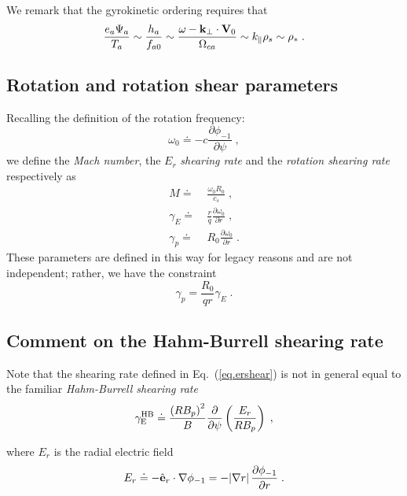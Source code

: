 We remark that the gyrokinetic ordering requires that 
%
\begin{equation}
\frac{e_a \Psi_a}{T_a} \sim \frac{h_a}{f_{a0}} 
\sim \frac{\omega - {\bf k}_\perp \cdot {\bf V}_0}{\Omega_{ca}} 
\sim k_\parallel \rho_s \sim \rho_* \; .  
\label{eq.ordrho}
\end{equation}

\subsection{Rotation and rotation shear parameters}

Recalling the definition of the rotation frequency:
%
\begin{equation}
\omega_0 \doteq -c \frac{\partial\phi_{-1}}{\partial\psi} \; , 
\end{equation}
%
we define the {\it Mach number}, the $E_r$ {\it shearing rate} and 
the {\it rotation shearing rate} respectively as
%
\begin{align}
M \doteq &~\frac{\omega_0 R_0}{c_s} 
 \; , \\
\gamma_E \doteq &~\frac{r}{q} \frac{\partial\omega_0}{\partial r} 
 \; ,\label{eq.ershear}\\
\gamma_p \doteq &~R_0 \frac{\partial\omega_0}{\partial r} \; .
\end{align}
%
These parameters are defined in this way for legacy reasons and 
are not independent; rather, we have the constraint
%
\begin{equation}
\gamma_p = \frac{R_0}{q r} \gamma_E \; .
\end{equation}

\subsection{Comment on the Hahm-Burrell shearing rate}

\noindent
Note that the shearing rate defined in Eq.~(\ref{eq.ershear}) is not 
in general equal to the familiar {\it Hahm-Burrell shearing rate} 
\cite{burrell:1997} 
%
\begin{equation}
\gamma_{\rm E}^{\rm HB} \doteq \frac{\left(R B_p\right)^2}{B}
\frac{\partial}{\partial \psi} \left( \frac{E_r}{R B_p} \right) \; ,
\end{equation}

\noindent
where $E_r$ is the radial electric field 
%
\begin{equation}
E_r \doteq - \hat{{\bf e}}_r \cdot \nabla \phi_{-1} 
    = - |\nabla r| \, \frac{\partial\phi_{-1}}{\partial r} \; . 
\end{equation}

